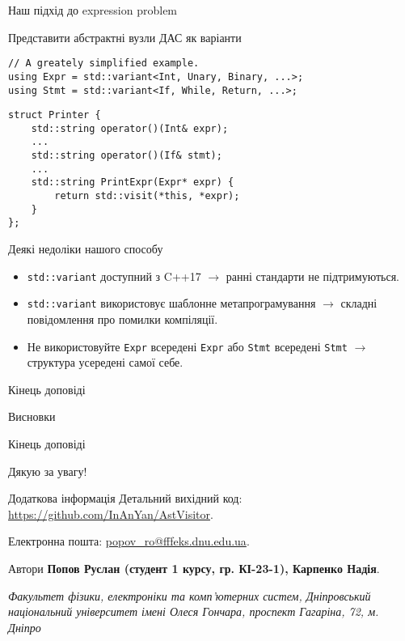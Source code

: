 \documentclass{beamer}
\begin{document}
	\begin{frame}[fragile]{Наш підхід до expression problem}
		\begin{block}{Представити абстрактні вузли ДАС як варіанти}
\begin{verbatim}
// A greately simplified example.
using Expr = std::variant<Int, Unary, Binary, ...>;
using Stmt = std::variant<If, While, Return, ...>;
\end{verbatim}
		\end{block}
\begin{verbatim}
struct Printer {
	std::string operator()(Int& expr);
	...
	std::string operator()(If& stmt);
	...
	std::string PrintExpr(Expr* expr) {
		return std::visit(*this, *expr);
	}
};
\end{verbatim}
	\end{frame}

	\begin{frame}{Деякі недоліки нашого способу}
		\begin{itemize}
			\item \texttt{std::variant} доступний з C++17 $\to$ ранні стандарти не підтримуються.
			\item \texttt{std::variant} використовує шаблонне метапрограмування $\to$ складні повідомлення про помилки компіляції.
			\item Не використовуйте \texttt{Expr} всередені \texttt{Expr} або \texttt{Stmt} всередені \texttt{Stmt} $\to$ структура усередені самої себе.
		\end{itemize}
	\end{frame}

    \begin{frame}{Кінець доповіді}
        \begin{center}
            \huge Висновки
        \end{center}
    \end{frame}

	\begin{frame}{Кінець доповіді}
		\begin{center}
			\huge Дякую за увагу!
		\end{center}
		
		\begin{exampleblock}{Додаткова інформація}
			Детальний вихідний код: \textcolor{blue}{\href{https://github.com/InAnYan/AstVisitor}{https://github.com/InAnYan/AstVisitor}}.
			
			Електронна пошта:  \textcolor{blue}{ \href{mailto:popov_ro@fffeks.dnu.edu.ua}{popov\_ro@fffeks.dnu.edu.ua}}.
		\end{exampleblock}
		
		\begin{block}{Автори}
			\textbf{Попов Руслан (студент 1 курсу, гр. КІ-23-1), Карпенко Надія}.
			
			\textit{Факультет фізики, електроніки та комп’ютерних систем, Дніпровський національний університет імені Олеся Гончара, проспект Гагаріна, 72, м. Дніпро}
		\end{block}
	\end{frame}
\end{document}
